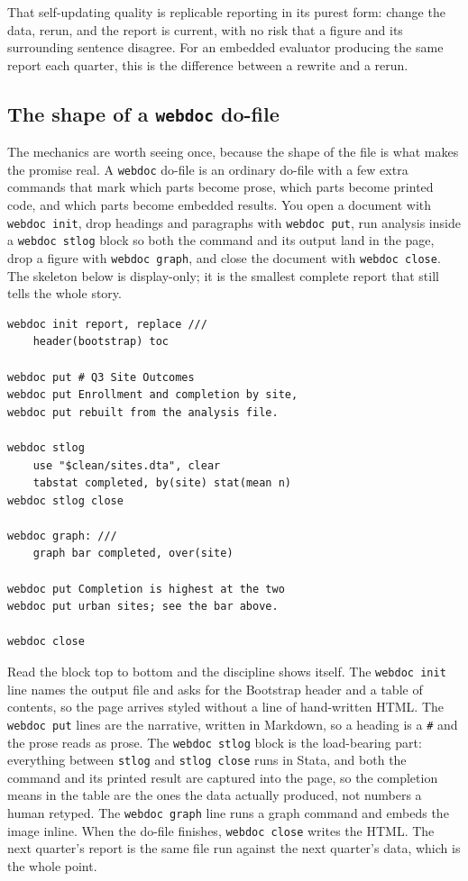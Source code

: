 \documentclass[
    a4paper,
    fontsize=10pt,
    twoside=true,
    numbers=noenddot,
]{kaobook}
\begin{document}
That self-updating quality is replicable reporting in its purest form: change the data, rerun, and the report is current, with no risk that a figure and its surrounding sentence disagree. For an embedded evaluator producing the same report each quarter, this is the difference between a rewrite and a rerun.

\subsection{The shape of a \texttt{webdoc} do-file}
The mechanics are worth seeing once, because the shape of the file is what makes the promise real. A \texttt{webdoc} do-file is an ordinary do-file with a few extra commands that mark which parts become prose, which parts become printed code, and which parts become embedded results. You open a document with \texttt{webdoc init}, drop headings and paragraphs with \texttt{webdoc put}, run analysis inside a \texttt{webdoc stlog} block so both the command and its output land in the page, drop a figure with \texttt{webdoc graph}, and close the document with \texttt{webdoc close}. The skeleton below is display-only; it is the smallest complete report that still tells the whole story.
{\footnotesize
\begin{verbatim}
webdoc init report, replace ///
    header(bootstrap) toc

webdoc put # Q3 Site Outcomes
webdoc put Enrollment and completion by site,
webdoc put rebuilt from the analysis file.

webdoc stlog
    use "$clean/sites.dta", clear
    tabstat completed, by(site) stat(mean n)
webdoc stlog close

webdoc graph: ///
    graph bar completed, over(site)

webdoc put Completion is highest at the two
webdoc put urban sites; see the bar above.

webdoc close
\end{verbatim}
}
Read the block top to bottom and the discipline shows itself. The \texttt{webdoc init} line names the output file and asks for the Bootstrap header and a table of contents, so the page arrives styled without a line of hand-written HTML. The \texttt{webdoc put} lines are the narrative, written in Markdown, so a heading is a \texttt{\#} and the prose reads as prose. The \texttt{webdoc stlog} block is the load-bearing part: everything between \texttt{stlog} and \texttt{stlog close} runs in Stata, and both the command and its printed result are captured into the page, so the completion means in the table are the ones the data actually produced, not numbers a human retyped. The \texttt{webdoc graph} line runs a graph command and embeds the image inline. When the do-file finishes, \texttt{webdoc close} writes the HTML. The next quarter's report is the same file run against the next quarter's data, which is the whole point.
\end{document}
